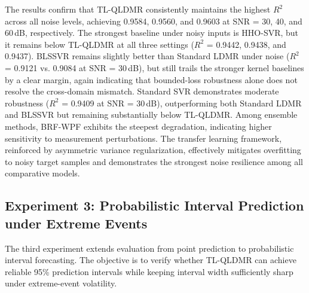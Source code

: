 The results confirm that TL-QLDMR consistently maintains the highest $R^2$ across all noise levels, achieving 0.9584, 0.9560, and 0.9603 at SNR = 30, 40, and 60\,dB, respectively. The strongest baseline under noisy inputs is HHO-SVR, but it remains below TL-QLDMR at all three settings ($R^2$ = 0.9442, 0.9438, and 0.9437). BLSSVR remains slightly better than Standard LDMR under noise ($R^2$ = 0.9121 vs. 0.9084 at SNR = 30\,dB), but still trails the stronger kernel baselines by a clear margin, again indicating that bounded-loss robustness alone does not resolve the cross-domain mismatch. Standard SVR demonstrates moderate robustness ($R^2$ = 0.9409 at SNR = 30\,dB), outperforming both Standard LDMR and BLSSVR but remaining substantially below TL-QLDMR. Among ensemble methods, BRF-WPF exhibits the steepest degradation, indicating higher sensitivity to measurement perturbations. The transfer learning framework, reinforced by asymmetric variance regularization, effectively mitigates overfitting to noisy target samples and demonstrates the strongest noise resilience among all comparative models.
\subsection{Experiment 3: Probabilistic Interval Prediction under Extreme Events}\label{sec:exp3}

The third experiment extends evaluation from point prediction to probabilistic interval forecasting. The objective is to verify whether TL-QLDMR can achieve reliable 95\% prediction intervals while keeping interval width sufficiently sharp under extreme-event volatility.



